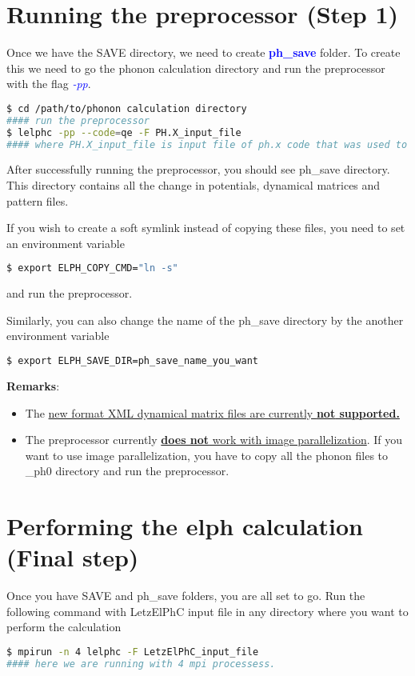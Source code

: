 \documentclass[12pt,twoside,openany]{book}
\begin{document}
\section{Running the preprocessor (Step 1)}
Once we have the SAVE directory, we need to create \textcolor{blue}{\bf{ph\_save}} folder. To create this we need 
to go the phonon calculation directory and run the preprocessor with the flag  \textcolor{blue}{\emph{-pp}}.
\begin{lstlisting}[language=bash]
$ cd /path/to/phonon calculation directory
#### run the preprocessor
$ lelphc -pp --code=qe -F PH.X_input_file
#### where PH.X_input_file is input file of ph.x code that was used to compute phonons
\end{lstlisting}
After successfully running the preprocessor, you should see ph\_save directory. This directory contains all the change in 
potentials, dynamical matrices and pattern files.

If you wish to create a soft symlink instead of copying these files, you need to set an environment variable
\begin{lstlisting}[language=bash]
$ export ELPH_COPY_CMD="ln -s"
\end{lstlisting}
and run the preprocessor.

Similarly, you can also change the name of the ph\_save directory by the another environment variable
\begin{lstlisting}[language=bash]
$ export ELPH_SAVE_DIR=ph_save_name_you_want
\end{lstlisting}

{\bf{Remarks}}:
\begin{itemize}
\item The \underline{new format XML dynamical matrix files are currently \bf{not} supported.}
\item The preprocessor currently \underline{{\bf{does not}} work with image parallelization}. If you want 
to use image parallelization, you have to copy all the phonon files to \_ph0 directory and run the 
preprocessor.
\end{itemize}


\section{Performing the elph calculation (Final step)}
Once you have SAVE and ph\_save folders, you are all set to go. Run the following command with LetzElPhC input file in 
any directory where you want to perform the calculation
\begin{lstlisting}[language=bash]
$ mpirun -n 4 lelphc -F LetzElPhC_input_file
#### here we are running with 4 mpi processess.
\end{lstlisting}
\end{document}
